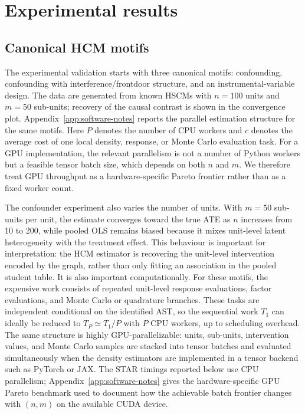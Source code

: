 \documentclass[unnumsec,webpdf,contemporary,large]{oup-authoring-template}%
\theoremstyle{thmstyleone}%
\theoremstyle{thmstyletwo}%
\theoremstyle{thmstylethree}%
\begin{document}
\section{Experimental results}
\label{sec:experiments}

\subsection{Canonical HCM motifs}

The experimental validation starts with three canonical motifs: confounding, confounding with interference/frontdoor structure, and an instrumental-variable design.
The data are generated from known HSCMs with $n=100$ units and $m=50$ sub-units; recovery of the causal contrast is shown in the convergence plot.
Appendix~\ref{app:software-notes} reports the parallel estimation structure for the same motifs.
Here $P$ denotes the number of CPU workers and $c$ denotes the average cost of one local density, response, or Monte Carlo evaluation task.
For a GPU implementation, the relevant parallelism is not a number of Python workers but a feasible tensor batch size, which depends on both $n$ and $m$.
We therefore treat GPU throughput as a hardware-specific Pareto frontier rather than as a fixed worker count.

The confounder experiment also varies the number of units.
With $m=50$ sub-units per unit, the estimate converges toward the true ATE as $n$ increases from 10 to 200, while pooled OLS remains biased because it mixes unit-level latent heterogeneity with the treatment effect.
This behaviour is important for interpretation: the HCM estimator is recovering the unit-level intervention encoded by the graph, rather than only fitting an association in the pooled student table.
It is also important computationally.
For these motifs, the expensive work consists of repeated unit-level response evaluations, factor evaluations, and Monte Carlo or quadrature branches.
These tasks are independent conditional on the identified AST, so the sequential work $T_1$ can ideally be reduced to $T_P\simeq T_1/P$ with $P$ CPU workers, up to scheduling overhead.
The same structure is highly GPU-parallelizable: units, sub-units, intervention values, and Monte Carlo samples are stacked into tensor batches and evaluated simultaneously when the density estimators are implemented in a tensor backend such as PyTorch or JAX\@.
The STAR timings reported below use CPU parallelism; Appendix~\ref{app:software-notes} gives the hardware-specific GPU Pareto benchmark used to document how the achievable batch frontier changes with $(n,m)$ on the available CUDA device.
\end{document}
